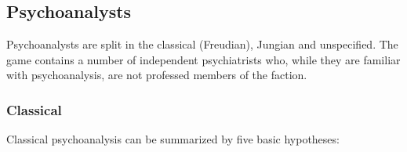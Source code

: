 \subsection{Psychoanalysts}
\label{psychoanalysts}

Psychoanalysts are split in the classical (Freudian), Jungian and unspecified. The game contains a number of independent psychiatrists who, while they are familiar with psychoanalysis, are not professed members of the faction.

\subsubsection{Classical}
\label{classical}

Classical psychoanalysis can be summarized by five basic hypotheses:

